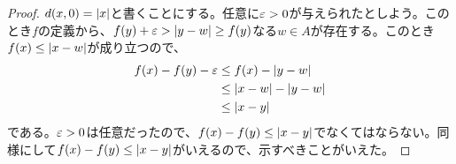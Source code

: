\newpage

\begin{proof}
  $d(x,0) = \abs{x}$と書くことにする。任意に$\ve > 0$が与えられたとしよう。このとき$f$の定義から、$f(y) + \ve > \abs{y-w} \geq f(y)$なる$w \in A$が存在する。このとき$f(x) \leq \abs{x-w}$が成り立つので、
  \begin{align*}
    f(x) - f(y) - \ve &\leq f(x) - \abs{y-w} \\
    &\leq \abs{x-w} - \abs{y-w} \\
    &\leq \abs{x-y}
  \end{align*}
  である。$\ve > 0$は任意だったので、$f(x) - f(y) \leq \abs{x-y}$でなくてはならない。同様にして$f(x) - f(y) \leq \abs{x-y}$がいえるので、示すべきことがいえた。
\end{proof}
